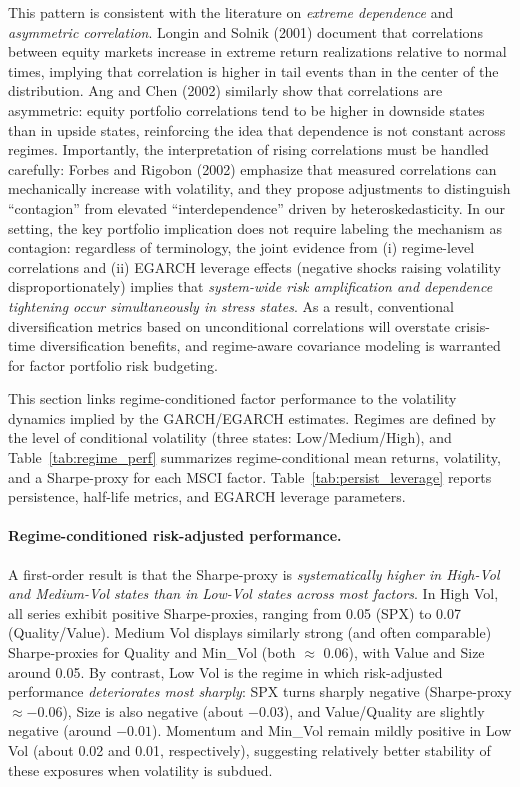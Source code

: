 \documentclass{article}
\begin{document}
This pattern is consistent with the literature on \emph{extreme dependence} and \emph{asymmetric correlation}. Longin and Solnik (2001) document that correlations between equity markets increase in extreme return realizations relative to normal times, implying that correlation is higher in tail events than in the center of the distribution.\cite{longin2001} Ang and Chen (2002) similarly show that correlations are asymmetric: equity portfolio correlations tend to be higher in downside states than in upside states, reinforcing the idea that dependence is not constant across regimes.\cite{angchen2002} Importantly, the interpretation of rising correlations must be handled carefully: Forbes and Rigobon (2002) emphasize that measured correlations can mechanically increase with volatility, and they propose adjustments to distinguish ``contagion'' from elevated ``interdependence'' driven by heteroskedasticity.\cite{forbes2002} In our setting, the key portfolio implication does not require labeling the mechanism as contagion: regardless of terminology, the joint evidence from (i) regime-level correlations and (ii) EGARCH leverage effects (negative shocks raising volatility disproportionately) implies that \emph{system-wide risk amplification and dependence tightening occur simultaneously in stress states}. As a result, conventional diversification metrics based on unconditional correlations will overstate crisis-time diversification benefits, and regime-aware covariance modeling is warranted for factor portfolio risk budgeting.\newline

This section links regime-conditioned factor performance to the volatility dynamics implied by the GARCH/EGARCH estimates. Regimes are defined by the level of conditional volatility (three states: Low/Medium/High), and Table~\ref{tab:regime_perf} summarizes regime-conditional mean returns, volatility, and a Sharpe-proxy for each MSCI factor. Table~\ref{tab:persist_leverage} reports persistence, half-life metrics, and EGARCH leverage parameters.

\paragraph{Regime-conditioned risk-adjusted performance.}

A first-order result is that the Sharpe-proxy is \emph{systematically higher in High-Vol and Medium-Vol states than in Low-Vol states across most factors}. In High Vol, all series exhibit positive Sharpe-proxies, ranging from 0.05 (SPX) to 0.07 (Quality/Value). Medium Vol displays similarly strong (and often comparable) Sharpe-proxies for Quality and Min\_Vol (both $\approx$ 0.06), with Value and Size around 0.05. By contrast, Low Vol is the regime in which risk-adjusted performance \emph{deteriorates most sharply}: SPX turns sharply negative (Sharpe-proxy $\approx -0.06$), Size is also negative (about $-0.03$), and Value/Quality are slightly negative (around $-0.01$). Momentum and Min\_Vol remain mildly positive in Low Vol (about 0.02 and 0.01, respectively), suggesting relatively better stability of these exposures when volatility is subdued.\newline
\end{document}
